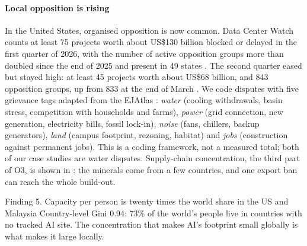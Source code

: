 \paragraph{Local opposition is rising} In the United States, organised opposition is now common. Data Center Watch
counts at least 75 projects worth about US\$130 billion blocked or delayed in the first quarter of 2026, with the
number of active opposition groups more than doubled since the end of 2025 and present in 49 states \citep{dcw2026}.
The second quarter eased but stayed high: at least 45 projects worth about US\$68 billion, and 843 opposition groups, up from 833
at the end of March \citep{dcw2026q2}.
We code disputes with five grievance tags adapted from the EJAtlas \citep{temper2015}: \emph{water} (cooling
withdrawals, basin stress, competition with households and farms), \emph{power} (grid connection, new generation,
electricity bills, fossil lock-in), \emph{noise} (fans, chillers, backup generators), \emph{land} (campus footprint,
rezoning, habitat) and \emph{jobs} (construction against permanent jobs). This is a coding framework, not a measured
total; both of our case studies are water disputes. Supply-chain concentration, the third part of O3, is shown in
: the minerals come from a few countries, and one export ban can reach the whole build-out.

\begin{finding}{Finding 5. Capacity per person is twenty times the world share in the US and Malaysia}
Country-level Gini 0.94: 73\% of the world's people live in countries with no tracked AI site. The concentration that
makes AI's footprint small globally is what makes it large locally.
\end{finding}
